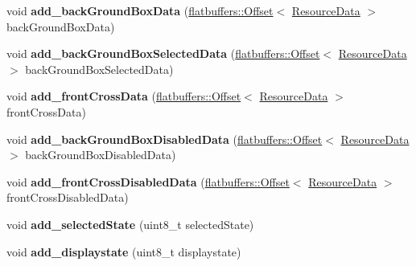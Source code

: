 \begin{DoxyCompactItemize}
void {\bfseries add\+\_\+back\+Ground\+Box\+Data} (\hyperlink{structflatbuffers_1_1Offset}{flatbuffers\+::\+Offset}$<$ \hyperlink{structflatbuffers_1_1ResourceData}{Resource\+Data} $>$ back\+Ground\+Box\+Data)
\item 
\mbox{\label{structflatbuffers_1_1CheckBoxOptionsBuilder_abf7c7d581e8b48d48367ec676b6c5842}} 
void {\bfseries add\+\_\+back\+Ground\+Box\+Selected\+Data} (\hyperlink{structflatbuffers_1_1Offset}{flatbuffers\+::\+Offset}$<$ \hyperlink{structflatbuffers_1_1ResourceData}{Resource\+Data} $>$ back\+Ground\+Box\+Selected\+Data)
\item 
\mbox{\label{structflatbuffers_1_1CheckBoxOptionsBuilder_a7de8d21d784d59c3e895de37cbf99f81}} 
void {\bfseries add\+\_\+front\+Cross\+Data} (\hyperlink{structflatbuffers_1_1Offset}{flatbuffers\+::\+Offset}$<$ \hyperlink{structflatbuffers_1_1ResourceData}{Resource\+Data} $>$ front\+Cross\+Data)
\item 
\mbox{\label{structflatbuffers_1_1CheckBoxOptionsBuilder_a15f9739ccc95c69bc59b4e0f53239798}} 
void {\bfseries add\+\_\+back\+Ground\+Box\+Disabled\+Data} (\hyperlink{structflatbuffers_1_1Offset}{flatbuffers\+::\+Offset}$<$ \hyperlink{structflatbuffers_1_1ResourceData}{Resource\+Data} $>$ back\+Ground\+Box\+Disabled\+Data)
\item 
\mbox{\label{structflatbuffers_1_1CheckBoxOptionsBuilder_a3abfc58e3df24a2e8e5244c66531601f}} 
void {\bfseries add\+\_\+front\+Cross\+Disabled\+Data} (\hyperlink{structflatbuffers_1_1Offset}{flatbuffers\+::\+Offset}$<$ \hyperlink{structflatbuffers_1_1ResourceData}{Resource\+Data} $>$ front\+Cross\+Disabled\+Data)
\item 
\mbox{\label{structflatbuffers_1_1CheckBoxOptionsBuilder_a4b38f22c1f03918e933f08016a587800}} 
void {\bfseries add\+\_\+selected\+State} (uint8\+\_\+t selected\+State)
\item 
\mbox{\label{structflatbuffers_1_1CheckBoxOptionsBuilder_a123b4cc1d2b211073e74f40dd44dab69}} 
void {\bfseries add\+\_\+displaystate} (uint8\+\_\+t displaystate)

\end{DoxyCompactItemize}
